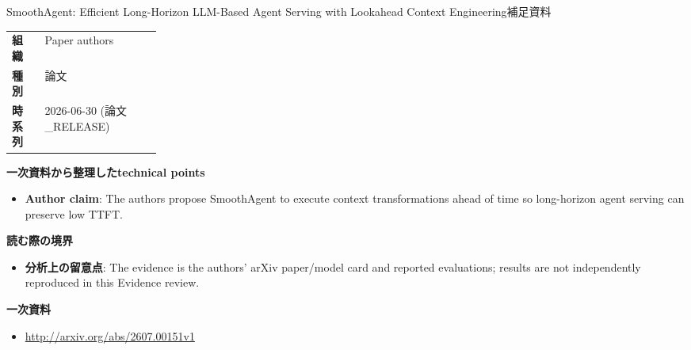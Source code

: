 \begin{technicalnote}{SmoothAgent: Efficient Long-Horizon LLM-Based Agent Serving with Lookahead Context Engineering}{補足資料}
\begin{tabularx}{\linewidth}{@{}>{\bfseries}p{0.22\linewidth}X@{}}
組織 & Paper authors \\
種別 & 論文 \\
時系列 & 2026-06-30 (論文\_RELEASE) \\
\end{tabularx}
\smallskip
{\bfseries 一次資料から整理したtechnical points}
\begin{itemize}[leftmargin=1.5em,itemsep=0.35em]
\item \textbf{Author claim}: The authors propose SmoothAgent to execute context transformations ahead of time so long-horizon agent serving can preserve low TTFT.
\end{itemize}
{\bfseries 読む際の境界}
\begin{itemize}[leftmargin=1.5em,itemsep=0.35em]
\item \textbf{分析上の留意点}: The evidence is the authors' arXiv paper/model card and reported evaluations; results are not independently reproduced in this Evidence review.
\end{itemize}
{\bfseries 一次資料}
\begingroup\sloppy
\begin{itemize}[leftmargin=1.5em,itemsep=0.25em]
\item {\scriptsize\url{http://arxiv.org/abs/2607.00151v1}}
\end{itemize}
\endgroup
\end{technicalnote}
\medskip
